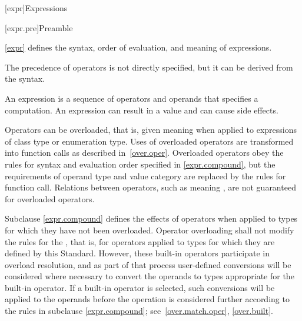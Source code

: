 [expr]{Expressions}


%
%
%
%
%
%
%

[expr.pre]{Preamble}

\pnum
{}%
\begin{note}
\ref{expr} defines the syntax, order of evaluation, and meaning
of expressions.
\begin{footnote}
The precedence of operators is not directly specified, but it can be
derived from the syntax.
\end{footnote}
An expression is a sequence of operators and operands that specifies a
computation. An expression can result in a value and can cause side
effects.
\end{note}

\pnum
{}%
\begin{note}
Operators can be overloaded, that is, given meaning when applied to
expressions of class type or enumeration
type. Uses of overloaded operators are transformed into
function calls as described in~\ref{over.oper}. Overloaded operators
obey the rules for syntax and evaluation order specified in \ref{expr.compound},
but the requirements of operand type and value category are replaced
by the rules for function call. Relations between operators, such as
 meaning , are not guaranteed for overloaded
operators.
\end{note}

\pnum
Subclause \ref{expr.compound} defines the effects of operators when applied to types
for which they have not been overloaded. Operator overloading shall not
modify the rules for the ,
that is, for operators applied to types for which they are defined by this
Standard. However, these built-in operators participate in overload
resolution, and as part of that process user-defined conversions will be
considered where necessary to convert the operands to types appropriate
for the built-in operator. If a built-in operator is selected, such
conversions will be applied to the operands before the operation is
considered further according to the rules in subclause \ref{expr.compound};
see~\ref{over.match.oper}, \ref{over.built}.

